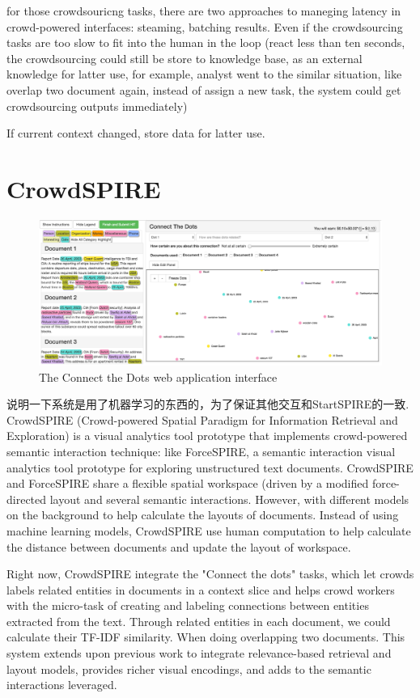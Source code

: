 \documentclass[journal]{vgtc}                %
\begin{document}
for those crowdsouricng tasks, there are two approaches to maneging latency in crowd-powered interfaces: steaming, batching results.
Even if the crowdsourcing tasks are too slow to fit into the human in the loop (react less than ten seconds, the crowdsourcing could still be store to knowledge base, as an external knowledge for latter use, for example, analyst went to the similar situation, like overlap two document again, instead of assign a new task, the system could get crowdsourcing outputs immediately)


If current context changed, store data for latter use.


\section{CrowdSPIRE}
\begin{figure}
 \centering
  \includegraphics[width=\textwidth]{Hit}
 \caption{The Connect the Dots web application interface}
 \label{fig:hit}
\end{figure}

说明一下系统是用了机器学习的东西的，为了保证其他交互和StartSPIRE的一致.
CrowdSPIRE (Crowd-powered Spatial Paradigm for Information Retrieval and Exploration) is a visual analytics tool prototype that implements crowd-powered semantic interaction technique: like ForceSPIRE, a semantic interaction visual analytics tool prototype for exploring unstructured text documents.
CrowdSPIRE and ForceSPIRE share a flexible spatial workspace (driven by a modified force-directed layout and several semantic interactions.
However, with different models on the background to help calculate the layouts of documents.
Instead of using machine learning models, CrowdSPIRE use human computation to help calculate the distance between documents and update the layout of workspace.

Right now, CrowdSPIRE integrate the "Connect the dots" tasks, which let crowds labels related entities in documents in a context slice and helps crowd workers with the micro-task of creating and labeling connections between entities extracted from the text.
Through related entities in each document, we could calculate their TF-IDF similarity. When doing overlapping two documents.
This system extends upon previous work to integrate relevance-based retrieval and layout models, provides richer visual encodings, and adds to the semantic interactions leveraged.
\end{document}
